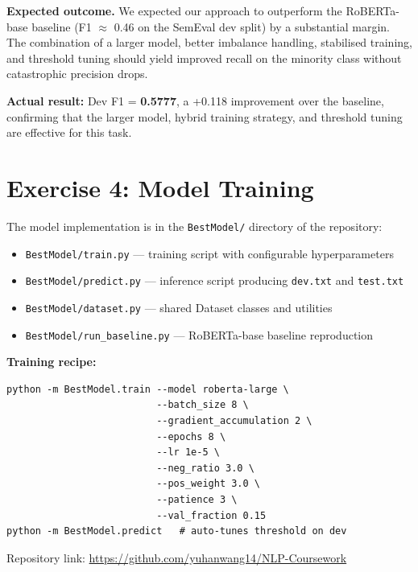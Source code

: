 \documentclass[11pt,a4paper]{article}
\begin{document}
\textbf{Expected outcome.} We expected our approach to outperform the
RoBERTa-base baseline (F1 $\approx$ 0.46 on the SemEval dev split) by a
substantial margin. The combination of a larger model, better imbalance
handling, stabilised training, and threshold tuning should yield improved
recall on the minority class without catastrophic precision drops.

\textbf{Actual result:} Dev F1 = \textbf{0.5777}, a +0.118 improvement over
the baseline, confirming that the larger model, hybrid training strategy,
and threshold tuning are effective for this task.


\newpage
\section{Exercise 4: Model Training}
\label{sec:ex4}

The model implementation is in the \texttt{BestModel/} directory of the
repository:

\begin{itemize}[leftmargin=*]
    \item \texttt{BestModel/train.py} — training script with configurable
          hyperparameters
    \item \texttt{BestModel/predict.py} — inference script producing
          \texttt{dev.txt} and \texttt{test.txt}
    \item \texttt{BestModel/dataset.py} — shared Dataset classes and
          utilities
    \item \texttt{BestModel/run\_baseline.py} — RoBERTa-base baseline
          reproduction
\end{itemize}

\textbf{Training recipe:}
\begin{verbatim}
python -m BestModel.train --model roberta-large \
                          --batch_size 8 \
                          --gradient_accumulation 2 \
                          --epochs 8 \
                          --lr 1e-5 \
                          --neg_ratio 3.0 \
                          --pos_weight 3.0 \
                          --patience 3 \
                          --val_fraction 0.15
python -m BestModel.predict   # auto-tunes threshold on dev
\end{verbatim}

Repository link: \url{https://github.com/yuhanwang14/NLP-Coursework}
\end{document}

